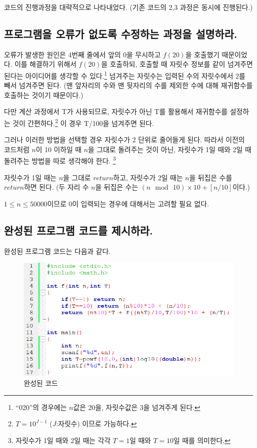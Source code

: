 \documentclass{oblivoir}
\begin{document}
코드의 진행과정을 대략적으로 나타내었다. (기존 코드의 2,3 과정은 동시에 진행된다.)

\subsection{프로그램을 오류가 없도록 수정하는 과정을 설명하라.}
\hspace{10pt} 오류가 발생한 원인은 4번째 줄에서 앞의 0을 무시하고 $f(20)$을 호출했기 때문이었다. 이를 해결하기 위해서 $f(20)$을 호출하되, 호출할 때 자릿수 정보를 같이 넘겨주면 된다는 아이디어를 생각할 수 있다.\footnote{``020''의 경우에는 $n$값은 20을, 자릿수값은 3을 넘겨주게 된다.} 넘겨주는 자릿수는 입력된 수의 자릿수에서 2를 빼서 넘겨주면 된다. (맨 앞자리의 수와 맨 뒷자리의 수를 제외한 수에 대해 재귀함수를 호출하는 것이기 때문이다.)


다만 계산 과정에서 T가 사용되므로, 자릿수가 아닌 T를 활용해서 재귀함수를 설정하는 것이 간편하다.\footnote{$T = 10^{J-1}$ ($J$:자릿수) 이므로 가능하다.} 
이 경우 T/100을 넘겨주면 된다.

그러나 이러한 방법을 선택할 경우 자릿수가 2 단위로 줄어들게 된다. 따라서 이전의 코드처럼 $n$이 10 이하일 때 $n$을 그대로 돌려주는 것이 아닌, 자릿수가 1일 때와 2일 때 돌려주는 방법을 따로 생각해야 한다. \footnote{자릿수가 1일 때와 2일 때는 각각 $T=1$일 때와 $T=10$일 때를 의미한다.} 

자릿수가 1일 때는 $n$을 그대로 $return$하고, 자릿수가 2일 때는 $n$을 뒤집은 수를 $return$하면 된다.   (두 자리 수 $n$을 뒤집은 수는 $(n\,\bmod\,10)\times 10 + \left[ n/10 \right]$이다.)

$1\leq n\leq 50000$이므로 0이 입력되는 경우에 대해서는 고려할 필요 없다.

\subsection{완성된 프로그램 코드를 제시하라.}
\hspace{10pt} 완성된 프로그램 코드는 다음과 같다.
\\

\begin{figure}[ht]
\centering
\includegraphics[scale=0.7]{after.png}
\caption{완성된 코드}
\end{figure}
\end{document}
